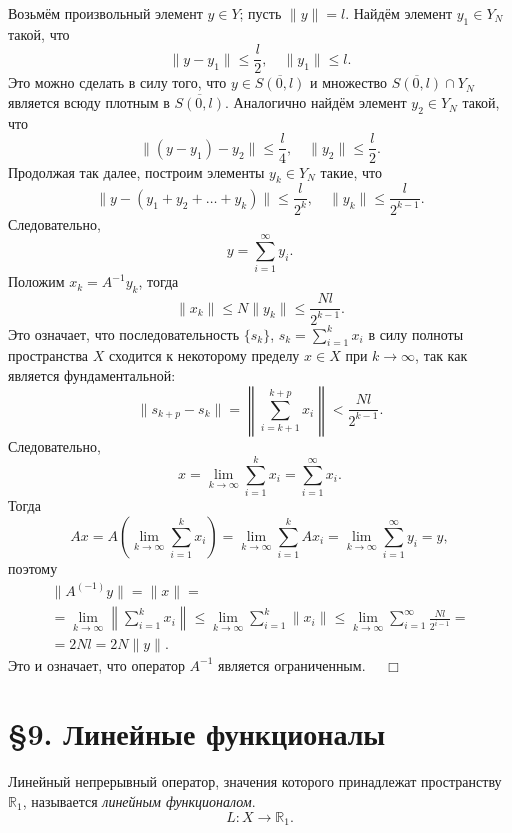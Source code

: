 \documentclass[12pt,a4paper, titlepage]{article}
\begin{document}
Возьмём произвольный элемент $y \in Y$; пусть $ \|y\| = l$. Найдём элемент $y_1 \in Y_N$ такой, что
$$
\|y - y_1\| \leqslant \frac l 2, \quad \|y_1\| \leqslant l.
$$
Это можно сделать в силу того, что $y \in \overline{S(0, l)}$ и множество $\overline{S(0, l)} \cap Y_N$ является всюду плотным в $\overline{S(0, l)}$. Аналогично найдём элемент $y_2 \in Y_N$ такой, что
$$
\|(y - y_1) - y_2\| \leqslant \frac l 4, \quad \|y_2\| \leqslant \frac l 2.
$$
Продолжая так далее, построим элементы $y_k \in Y_N$ такие, что
$$
\|y - (y_1 + y_2 + \dots + y_k)\| \leqslant \frac l {2^k}, \quad \|y_k\| \leqslant \frac l {2^{k-1}}.
$$
Следовательно,
$$
y = \sum_{i = 1}^{\infty} y_i.
$$
Положим $x_k = A^{-1} y_k$, тогда
$$
\|x_k\| \leqslant N \|y_k\| \leqslant \frac {Nl} {2^{k-1}}.
$$
Это означает, что последовательность $\lbrace s_k \rbrace$, $s_k = \sum_{i = 1}^k x_i$ в силу полноты пространства $X$ сходится к некоторому пределу $x \in X$ при $k\to\infty$, так как является фундаментальной:
$$
\|s_{k+p} - s_k\| = \left\| \sum_{i = k+1}^{k+p} x_i \right\| < \frac {Nl} {2^{k-1}}.
$$
Следовательно,
$$
x = \lim_{k\to\infty} \sum_{i=1}^k x_i = \sum_{i=1}^\infty x_i.
$$
Тогда
$$
Ax = A \left( \lim_{k\to\infty} \sum_{i=1}^k x_i \right) = \lim_{k\to\infty} \sum_{i=1}^k Ax_i = \lim_{k\to\infty} \sum_{i = 1}^{\infty} y_i = y,
$$
поэтому
\begin{multline*}
\|A^{(-1)} y\| = \|x\| = \\
= \lim_{k\to\infty} \left\| \sum_{i=1}^k x_i \right\| \leqslant \lim_{k\to\infty} \sum_{i=1}^k \|x_i\| \leqslant
\lim_{k\to\infty} \sum_{i=1}^\infty \frac {Nl} {2^{i-1}} = \\
= 2Nl = 2N \|y\|.
\end{multline*}
Это и означает, что оператор $A^{-1}$ является ограниченным. $\quad \Box$\\












\section*{ \S 9. Линейные функционалы}

Линейный непрерывный оператор, значения которого принадлежат пространству $\mathbb{R}_1$, называется \textit{линейным функционалом}.
$$
L: X \to \mathbb{R}_1.
$$
\end{document}
